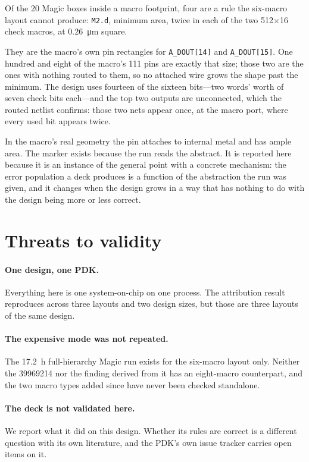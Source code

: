 \documentclass[11pt,a4paper]{article}
\begin{document}
Of the \num{20} Magic boxes inside a macro footprint, four are a rule the
six-macro layout cannot produce: \texttt{M2.d}, minimum area, twice in
each of the two \SI{512}{}$\times$\SI{16}{} check macros, at
\SI{0.26}{\um} square.

They are the macro's own pin rectangles for \texttt{A\_DOUT[14]} and
\texttt{A\_DOUT[15]}. One hundred and eight of the macro's \num{111} pins
are exactly that size; those two are the ones with nothing routed to
them, so no attached wire grows the shape past the minimum. The design
uses fourteen of the sixteen bits---two words' worth of seven check bits
each---and the top two outputs are unconnected, which the routed netlist
confirms: those two nets appear once, at the macro port, where every used
bit appears twice.

In the macro's real geometry the pin attaches to internal metal and has
ample area. The marker exists because the run reads the abstract. It is
reported here because it is an instance of the general point with a
concrete mechanism: the error population a deck produces is a function of
the abstraction the run was given, and it changes when the design grows
in a way that has nothing to do with the design being more or less
correct.

\section{Threats to validity}
\label{sec:threats}

\paragraph{One design, one PDK.} Everything here is one system-on-chip on
one process. The attribution result reproduces across three layouts and
two design sizes, but those are three layouts of the same design.

\paragraph{The expensive mode was not repeated.} The
\SI{17.2}{\hour} full-hierarchy Magic run exists for the six-macro layout
only. Neither the \num{39969214} nor the finding derived from it has an
eight-macro counterpart, and the two macro types added since have never
been checked standalone.

\paragraph{The deck is not validated here.} We report what it did on this
design. Whether its rules are correct is a different question with its
own literature, and the PDK's own issue tracker carries open items on it.
\end{document}
